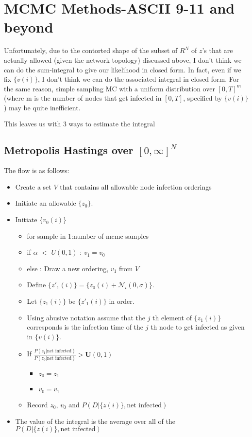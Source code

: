 \documentclass{article}
\begin{document}
\section{MCMC Methods-ASCII 9-11 and beyond}

Unfortunately, due to the contorted shape of the subset of
$R^N$ of $z$'s that are actually allowed (given the network topology)
discussed above, I don't think we can do the sum-integral to give our
likelihood in closed form. In fact, even if we fix $\{v(i)\}$, I don't
think we can do the associated integral in closed form. For the same
reason, simple sampling MC with a uniform distribution over $[0, T]^m$
(where m is the number of nodes that get infected in $[0, T]$, specified
by $\{v(i)\}$) may be quite inefficient.

This leaves us with 3 ways to estimate the integral

\subsection{Metropolis Hastings over $[0, \infty]^N$}

The flow is as follows:
\begin{itemize}
\item Create a set $V$ that contains all allowable node infection orderings
\item Initiate an allowable $\{z_0\}$.
\item Initiate $\{v_0(i)\}$
\begin{itemize}
\item for sample in 1:number of mcmc samples
\item if $\alpha$ $<$ $U(0,1)$ : $v_1 = v_0$
\item else : Draw a new ordering, $v_1$ from $V$
\item Define $\{z'_1(i)\} = \{z_0(i) + \mathcal{N}_i(0, \sigma)\}$.
\item Let $\{z_1(i)\}$ be $\{z'_1(i)\}$ in order.
\item Using abusive notation assume that the $j$ th element of $\{z_1(i)\}$ corresponds is the infection time of the $j$ th node to get
infected as given in $\{v(i)\}$.
\item If $\frac{P(z_1 | \text{net infected})}{P(z_0 | \text{net infected})} > \mathbf{U}(0,1)$
\begin{itemize}
\item $z_0 =z_1$
\item $v_0 = v_1$
\end{itemize}
\item Record $z_0$, $v_0$ and $P(D | \{z(i)\}, \text{net infected} )$
\end{itemize}
\item The value of the integral is the average over all of the $P(D | \{z(i)\}, \text{net infected} )$
\end{itemize}
\end{document}
